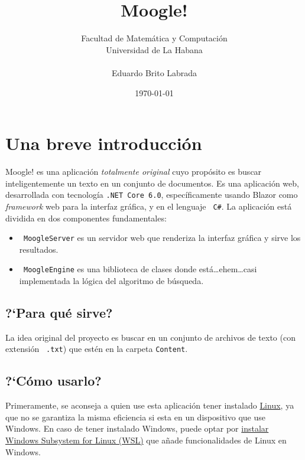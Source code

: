 \documentclass{report}
\begin{document}
\title{\bf \LARGE Moogle!}
\author{Facultad de Matem\'atica y Computaci\'on \\ Universidad de La Habana \\ \\ Eduardo Brito Labrada}
\date{\today}

\maketitle

\section*{Una breve introducci\'on}

Moogle! es una aplicación {\it totalmente original} cuyo propósito es buscar inteligentemente un texto en un conjunto de documentos. Es una aplicación web, desarrollada con tecnología {\tt \color{gray45}.NET Core 6.0}, específicamente usando Blazor como {\it framework} web para la interfaz gráfica, y en el lenguaje {\tt \color{gray45} C\#}.
La aplicación está dividida en dos componentes fundamentales:

\begin{itemize}
	\item {\tt \color{gray45} MoogleServer} es un servidor web que renderiza la interfaz gráfica y sirve los resultados.
	\item {\tt \color{gray45} MoogleEngine} es una biblioteca de clases donde está\dots ehem\dots casi implementada la lógica del algoritmo de búsqueda.
\end{itemize}

\subsection*{?`Para qu\'e sirve?}

La idea original del proyecto es buscar en un conjunto de archivos de texto (con extensión {\tt \color{gray45} .txt}) que estén en la carpeta {\tt \color{gray45}Content}.

\subsection*{?`C\'omo usarlo?}

Primeramente, se aconseja a quien use esta aplicaci\'on tener instalado \href{https://es.wikipedia.org/wiki/Linux}{Linux}, ya que no se garantiza la misma eficiencia si esta en un dispositivo que use Windows.
En caso de tener instalado Windows, puede optar por \href{https://learn.microsoft.com/es-es/windows/wsl/install}{instalar Windows Subsystem for Linux (WSL)} que a\~nade
funcionalidades de Linux en Windows.
\end{document}
